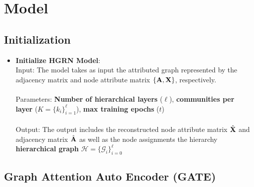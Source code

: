 \documentclass[a4paper,12pt]{article}
\begin{document}
	\newpage
	\section{Model}
	\subsection{Initialization}
	\begin{itemize}
		\item[]{\textbf{Initialize HGRN Model}: \\
			Input: The model takes as input the attributed graph represented by the adjacency matrix and node attribute matrix $\{{\bf A}, {\bf X}\}$, respectively. \\
			\\
			Parameters: \textbf{Number of hierarchical layers} ($\ell$), \textbf{communities per layer} ($K =\{k_i\}_{i=1}^\ell$), \textbf{max training epochs} ($t$) \\
			\\
			Output: The output includes the reconstructed node attribute matrix $\hat{\bf X}$ and adjacency matrix $\hat{\bf A}$ as well as the node assignments the hierarchy \textbf{hierarchical graph} $\mathcal{H} = \{\mathcal{G}_i\}_{i = 0}^\ell$
		}
	\end{itemize}
	

	\subsection{Graph Attention Auto Encoder (GATE)}			
\end{document}
